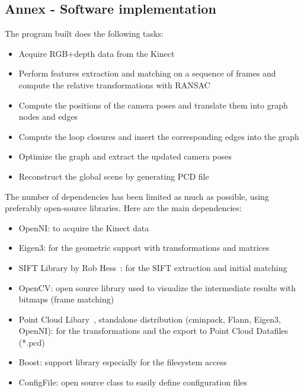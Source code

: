 \begin{appendices}
\chapter{Annex - Software implementation}

The program built does the following tasks:
\begin{itemize}
\item Acquire RGB+depth data from the Kinect
\item Perform features extraction and matching on a sequence of frames and compute the relative transformations with RANSAC
\item Compute the positions of the camera poses and translate them into graph nodes and edges
\item Compute the loop closures and insert the corresponding edges into the graph
\item Optimize the graph and extract the updated camera poses
\item Reconstruct the global scene by generating PCD file
\end{itemize}

The number of dependencies has been limited as much as possible, using preferably open-source libraries.
Here are the main dependencies:
\begin{itemize}
\item OpenNI: to acquire the Kinect data
\item Eigen3: for the geometric support with transformations and matrices
\item SIFT Library by Rob Hess~\cite{hess_sift}: for the SIFT extraction and initial matching
\item OpenCV: open source library used to visualize the intermediate results with bitmaps (frame matching)
\item Point Cloud Libary~\cite{Rusu_ICRA2011_PCL}, standalone distribution (cminpack, Flann, Eigen3, OpenNI): for the transformations and the export to Point Cloud Datafiles (*.pcd)
\item Boost: support library especially for the filesystem access
\item ConfigFile: open source class to easily define configuration files
\end{itemize}

\end{appendices}

